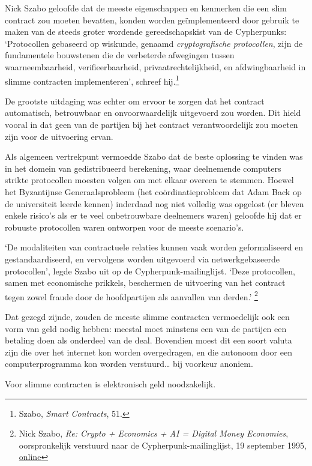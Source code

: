 \documentclass[
  a5paper,
  smalldemyvopaper,11pt,twoside,onecolumn,openright,extrafontsizes,
hidelinks]{memoir}
\begin{document}
Nick Szabo geloofde dat de meeste eigenschappen en kenmerken die een
slim contract zou moeten bevatten, konden worden geïmplementeerd door
gebruik te maken van de steeds groter wordende gereedschapskist van de
Cypherpunks: `Protocollen gebaseerd op wiskunde, genaamd
\emph{cryptografische protocollen}, zijn de fundamentele bouwstenen die
de verbeterde afwegingen tussen waarneembaarheid, verifieerbaarheid,
privaatrechtelijkheid, en afdwingbaarheid in slimme contracten
implementeren', schreef hij.\footnote{Szabo, \emph{Smart Contracts}, 51.}

De grootste uitdaging was echter om ervoor te zorgen dat het contract
automatisch, betrouwbaar en onvoorwaardelijk uitgevoerd zou worden. Dit
hield vooral in dat geen van de partijen bij het contract
verantwoordelijk zou moeten zijn voor de uitvoering ervan.

Als algemeen vertrekpunt vermoedde Szabo dat de beste oplossing te
vinden was in het domein van gedistribueerd berekening, waar deelnemende
computers strikte protocollen moesten volgen om met elkaar overeen te
stemmen. Hoewel het Byzantijnse Generaalsprobleem (het
coördinatieprobleem dat Adam Back op de universiteit leerde kennen)
inderdaad nog niet volledig was opgelost (er bleven enkele risico's als
er te veel onbetrouwbare deelnemers waren) geloofde hij dat er robuuste
protocollen waren ontworpen voor de meeste scenario's.

`De modaliteiten van contractuele relaties kunnen vaak worden
geformaliseerd en gestandaardiseerd, en vervolgens worden uitgevoerd via
netwerkgebaseerde protocollen', legde Szabo uit op de
Cypherpunk-mailinglijst. `Deze protocollen, samen met economische
prikkels, beschermen de uitvoering van het contract tegen zowel fraude
door de hoofdpartijen als aanvallen van derden.' \footnote{Nick Szabo,
  \emph{Re: Crypto + Economics + AI = Digital Money Economies},
  oorspronkelijk verstuurd naar de Cypherpunk-mailinglijst, 19 september
  1995,
  \href{https://cypherpunks.venona.com/date/1995/09/msg01303.html}{online}}

Dat gezegd zijnde, zouden de meeste slimme contracten vermoedelijk ook
een vorm van geld nodig hebben: meestal moet minstens een van de
partijen een betaling doen als onderdeel van de deal. Bovendien moest
dit een soort valuta zijn die over het internet kon worden overgedragen,
en die autonoom door een computerprogramma kon worden verstuurd\ldots{}
bij voorkeur anoniem.

Voor slimme contracten is elektronisch geld noodzakelijk.
\end{document}
